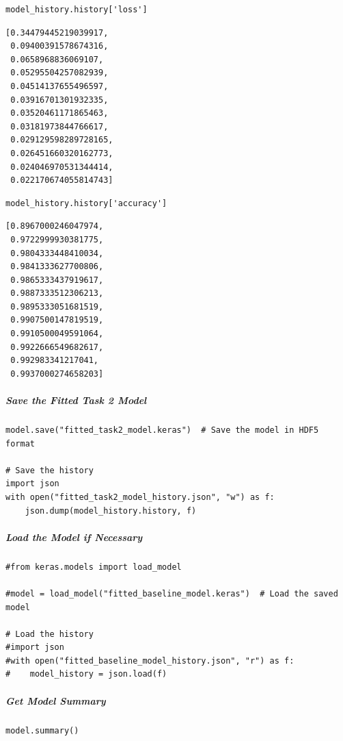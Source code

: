 \begin{verbatim}
model_history.history['loss']
\end{verbatim}

\begin{verbatim}
[0.34479445219039917,
 0.09400391578674316,
 0.0658968836069107,
 0.05295504257082939,
 0.04514137655496597,
 0.03916701301932335,
 0.03520461171865463,
 0.03181973844766617,
 0.029129598289728165,
 0.026451660320162773,
 0.024046970531344414,
 0.022170674055814743]
\end{verbatim}

\begin{verbatim}
model_history.history['accuracy']
\end{verbatim}

\begin{verbatim}
[0.8967000246047974,
 0.9722999930381775,
 0.9804333448410034,
 0.9841333627700806,
 0.9865333437919617,
 0.9887333512306213,
 0.9895333051681519,
 0.9907500147819519,
 0.9910500049591064,
 0.9922666549682617,
 0.992983341217041,
 0.9937000274658203]
\end{verbatim}

\subparagraph{Save the Fitted Task 2 Model}

\begin{verbatim}
model.save("fitted_task2_model.keras")  # Save the model in HDF5 format

# Save the history
import json
with open("fitted_task2_model_history.json", "w") as f:
    json.dump(model_history.history, f)
\end{verbatim}

\subparagraph{Load the Model if Necessary}

\begin{verbatim}
#from keras.models import load_model

#model = load_model("fitted_baseline_model.keras")  # Load the saved model

# Load the history
#import json
#with open("fitted_baseline_model_history.json", "r") as f:
#    model_history = json.load(f)
\end{verbatim}

\subparagraph{Get Model Summary}

\begin{verbatim}
model.summary()
\end{verbatim}

